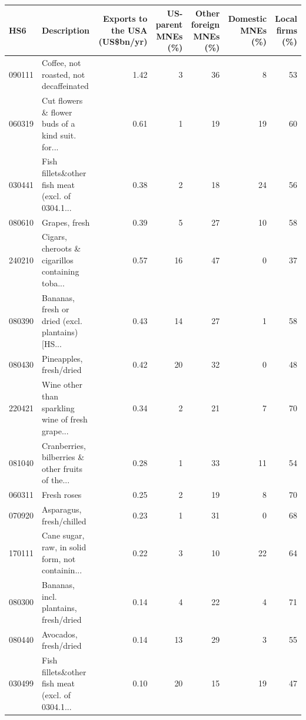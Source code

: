 \begin{tabular}{llrrrrr}
\toprule
HS6 & Description & \multicolumn{1}{p{2.0cm}}{\raggedright Exports to the USA (US\$bn/yr)} & \multicolumn{1}{p{1.8cm}}{\raggedright US-parent MNEs (\%)} & \multicolumn{1}{p{1.8cm}}{\raggedright Other foreign MNEs (\%)} & \multicolumn{1}{p{1.8cm}}{\raggedright Domestic MNEs (\%)} & \multicolumn{1}{p{1.8cm}}{\raggedright Local firms (\%)} \\
\midrule
090111 & Coffee, not roasted, not decaffeinated & 1.42 & 3 & 36 & 8 & 53 \\
060319 & Cut flowers \& flower buds of a kind suit. for... & 0.61 & 1 & 19 & 19 & 60 \\
030441 & Fish fillets\&other fish meat (excl. of 0304.1... & 0.38 & 2 & 18 & 24 & 56 \\
080610 & Grapes, fresh & 0.39 & 5 & 27 & 10 & 58 \\
240210 & Cigars, cheroots \& cigarillos containing toba... & 0.57 & 16 & 47 & 0 & 37 \\
080390 & Bananas, fresh or dried (excl. plantains) [HS... & 0.43 & 14 & 27 & 1 & 58 \\
080430 & Pineapples, fresh/dried & 0.42 & 20 & 32 & 0 & 48 \\
220421 & Wine other than sparkling wine of fresh grape... & 0.34 & 2 & 21 & 7 & 70 \\
081040 & Cranberries, bilberries \& other fruits of the... & 0.28 & 1 & 33 & 11 & 54 \\
060311 & Fresh roses & 0.25 & 2 & 19 & 8 & 70 \\
070920 & Asparagus, fresh/chilled & 0.23 & 1 & 31 & 0 & 68 \\
170111 & Cane sugar, raw, in solid form, not containin... & 0.22 & 3 & 10 & 22 & 64 \\
080300 & Bananas, incl. plantains, fresh/dried & 0.14 & 4 & 22 & 4 & 71 \\
080440 & Avocados, fresh/dried & 0.14 & 13 & 29 & 3 & 55 \\
030499 & Fish fillets\&other fish meat (excl. of 0304.1... & 0.10 & 20 & 15 & 19 & 47 \\
\bottomrule
\end{tabular}
